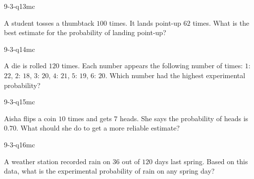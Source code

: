 \begin{practiceQuestion}{9-3-q13}{mc}
\begin{questionText}
A student tosses a thumbtack $100$ times. It lands point-up $62$ times. What is the best estimate for the probability of landing point-up?
\end{questionText}
\end{practiceQuestion}

\begin{practiceQuestion}{9-3-q14}{mc}
\begin{questionText}
A die is rolled $120$ times. Each number appears the following number of times: $1$: $22$, $2$: $18$, $3$: $20$, $4$: $21$, $5$: $19$, $6$: $20$. Which number had the highest experimental probability?
\end{questionText}
\end{practiceQuestion}

\begin{practiceQuestion}{9-3-q15}{mc}
\begin{questionText}
Aisha flips a coin $10$ times and gets $7$ heads. She says the probability of heads is $0.70$. What should she do to get a more reliable estimate?
\end{questionText}
\end{practiceQuestion}

\begin{practiceQuestion}{9-3-q16}{mc}
\begin{questionText}
A weather station recorded rain on $36$ out of $120$ days last spring. Based on this data, what is the experimental probability of rain on any spring day?
\end{questionText}
\end{practiceQuestion}

